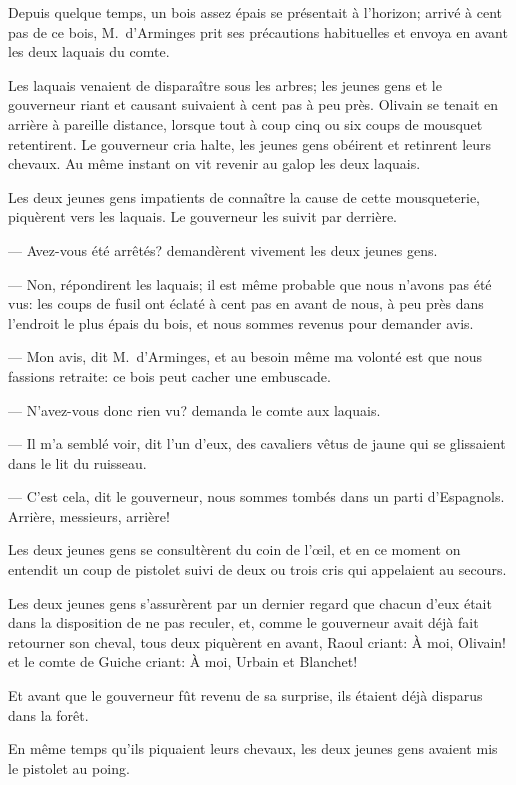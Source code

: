 Depuis quelque temps, un bois assez épais se présentait à l'horizon; arrivé à cent pas de ce bois, M.~d'Arminges prit ses précautions habituelles et envoya en avant les deux laquais du comte.

Les laquais venaient de disparaître sous les arbres; les jeunes gens et le gouverneur riant et causant suivaient à cent pas à peu près. Olivain se tenait en arrière à pareille distance, lorsque tout à coup cinq ou six coups de mousquet retentirent. Le gouverneur cria halte, les jeunes gens obéirent et retinrent leurs chevaux. Au même instant on vit revenir au galop les deux laquais.

Les deux jeunes gens impatients de connaître la cause de cette mousqueterie, piquèrent vers les laquais. Le gouverneur les suivit par derrière.

— Avez-vous été arrêtés? demandèrent vivement les deux jeunes gens.

— Non, répondirent les laquais; il est même probable que nous n'avons pas été vus: les coups de fusil ont éclaté à cent pas en avant de nous, à peu près dans l'endroit le plus épais du bois, et nous sommes revenus pour demander avis.

— Mon avis, dit M.~d'Arminges, et au besoin même ma volonté est que nous fassions retraite: ce bois peut cacher une embuscade.

— N'avez-vous donc rien vu? demanda le comte aux laquais.

— Il m'a semblé voir, dit l'un d'eux, des cavaliers vêtus de jaune qui se glissaient dans le lit du ruisseau.

— C'est cela, dit le gouverneur, nous sommes tombés dans un parti d'Espagnols. Arrière, messieurs, arrière!

Les deux jeunes gens se consultèrent du coin de l'œil, et en ce moment on entendit un coup de pistolet suivi de deux ou trois cris qui appelaient au secours.

Les deux jeunes gens s'assurèrent par un dernier regard que chacun d'eux était dans la disposition de ne pas reculer, et, comme le gouverneur avait déjà fait retourner son cheval, tous deux piquèrent en avant, Raoul criant: À moi, Olivain! et le comte de Guiche criant: À moi, Urbain et Blanchet!

Et avant que le gouverneur fût revenu de sa surprise, ils étaient déjà disparus dans la forêt.

En même temps qu'ils piquaient leurs chevaux, les deux jeunes gens avaient mis le pistolet au poing.

